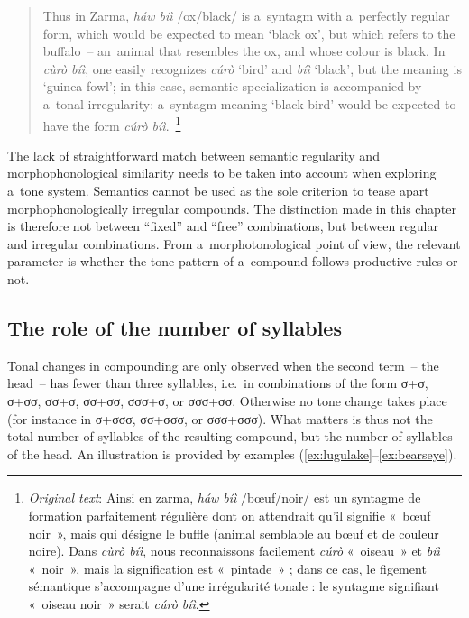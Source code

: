 \begin{quotation}
	Thus in Zarma, \textit{háw bíì} /ox/black/ is a~syntagm with a~perfectly regular form, which would
	be expected to mean ‘black ox’, but which refers to the buffalo~-- an~animal that resembles the ox,
	and whose colour is black. In \textit{cùrò bíì}, one easily recognizes \textit{cúrò} ‘bird’ and
	\textit{bíì} ‘black’, but the meaning is ‘guinea fowl’; in this case, semantic specialization is
	accompanied by a~tonal irregularity: a~syntagm meaning ‘black bird’ would be expected to have the
	form \textit{cúrò bíì}.~\citep[121]{creissels1991}\footnote{\textit{Original text}: Ainsi en zarma, \textit{háw bíì} /bœuf/noir/ est un syntagme de
		formation parfaitement régulière dont on attendrait qu’il signifie «~bœuf noir~», mais qui
		désigne le buffle (animal semblable au bœuf et de couleur noire). Dans \textit{cùrò bíì}, nous
		reconnaissons facilement \textit{cúrò} «~oiseau~» et \textit{bíì} «~noir~», mais la signification
		est «~pintade~» ; dans ce cas, le figement sémantique s’accompagne d’une irrégularité tonale : le
		syntagme signifiant «~oiseau noir~» serait \textit{cúrò bíì}.}
\end{quotation}

The lack of straightforward match between semantic regularity and morphophonological
similarity needs to be taken into account when exploring a~tone
system. Semantics cannot be used as the sole criterion to tease apart
morphophonologically irregular compounds. The distinction made in this chapter is therefore not between “fixed” and “free” combinations, but between regular
and irregular combinations. From a~morphotonological point of view, the relevant parameter is
whether the tone pattern of a~compound follows productive rules or not.

\subsection{The role of the number of syllables}
\label{sec:theroleofthenumberofsyllables}

Tonal changes in compounding are only observed when the second term~-- the head~-- has fewer than
three syllables, i.e.\ in combinations of the form σ+σ, σ+σσ, σσ+σ, σσ+σσ, σσσ+σ, or
σσσ+σσ. Otherwise no tone change takes place (for instance in σ+σσσ, σσ+σσσ, or σσσ+σσσ). What matters is thus not the total number of syllables
of the resulting compound, but the number of syllables of the head. An illustration is provided by examples (\ref{ex:lugulake}--\ref{ex:bearseye}).

